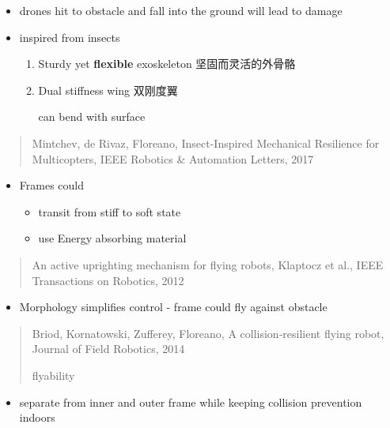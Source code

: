 \documentclass[]{article}
\begin{document}
\begin{itemize}
\item
  drones hit to obstacle and fall into the ground will lead to damage
\item
  inspired from insects

  \begin{enumerate}
  \def\labelenumi{\arabic{enumi}.}
  \item
    Sturdy yet \textbf{flexible} exoskeleton \textbar{}
    坚固而灵活的外骨骼
  \item
    Dual stiffness wing \textbar{} 双刚度翼

    can bend with surface
  \end{enumerate}
\end{itemize}

\begin{quote}
Mintchev, de Rivaz, Floreano, Insect-Inspired Mechanical Resilience for
Multicopters, IEEE Robotics \& Automation Letters, 2017
\end{quote}

\begin{itemize}
\item
  Frames could

  \begin{itemize}
  \item
    transit from stiff to soft state
  \item
    use Energy absorbing material
  \end{itemize}
\end{itemize}

\begin{quote}
An active uprighting mechanism for flying robots, Klaptocz et al., IEEE
Transactions on Robotics, 2012
\end{quote}

\begin{itemize}
\item
  Morphology simplifies control - frame could fly against obstacle
\end{itemize}

\begin{quote}
Briod, Kornatowski, Zufferey, Floreano, A collision‐resilient flying
robot, Journal of Field Robotics, 2014

flyability
\end{quote}

\begin{itemize}
\item
  separate from inner and outer frame while keeping collision prevention
  indoors
\end{itemize}
\end{document}
